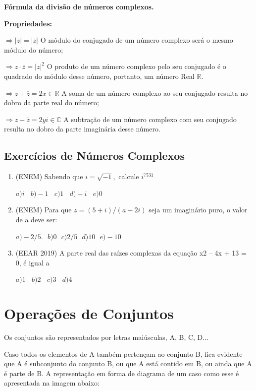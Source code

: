 \begin{multicols*}{2}
		\textbf{Fórmula da divisão de números complexos.}
		
		\textbf{Propriedades:}
		
		$\Rightarrow |z| = |\overline{z}| $ O módulo do conjugado de um número complexo será o mesmo módulo do número;
		
		$\Rightarrow z \cdot \overline{z} = |z|^2 $ O produto de um número complexo pelo seu conjugado é o quadrado do módulo desse número, portanto, um número Real $\mathbb{R}.$ 
		
		$\Rightarrow z + \overline{z} = 2 x \in \mathbb{R} $ A soma de um número complexo ao seu conjugado resulta no dobro da parte real do número;
		
		$\Rightarrow z - \overline{z} = 2yi \in \mathbb{C} $ A subtração de um número complexo com seu conjugado resulta no dobro da parte imaginária desse número.
		
		\subsection{Exercícios de Números Complexos}
		
		\begin{enumerate}
		
		\item (ENEM) Sabendo que  $ i = \sqrt{-1}, $ calcule $ i^{7531}$
		
 $a)  i \ \ \ \ b) -1 \ \ \ \  c) 1 \ \ \ \  d) -i \ \ \ \  e) 0$
 
 		\item (ENEM) Para que $z = (5 + i)/(a - 2i)$ seja um imaginário puro, o valor de a deve ser:

 $a) -2/5. \ \ \  b) 0 \ \ \ c) 2/5 \ \ \  d) 10  \ \ \  e) -10 $
		
		\item (EEAR 2019) A parte real das raízes complexas da equação x2 – 4x + 13 = 0, é igual a 

 $ a) 1 \ \ \ \  b) 2 \ \ \ \  c) 3 \ \ \ \  d) 4 $
		
		\end{enumerate}				
		

		\section*{Operações de Conjuntos}

		Os conjuntos são representados por letras maiúsculas, A, B, C, D...		

		Caso todos os elementos de A também pertençam ao conjunto B, fica evidente que A é subconjunto do conjunto B, ou que A está contido em B, ou ainda que A é parte de B. A representação em forma de diagrama de um caso como esse é apresentada na imagem abaixo:		
		

\end{multicols*}
